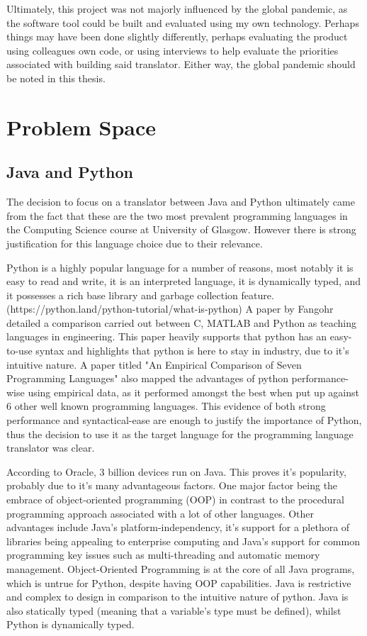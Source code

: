 \documentclass{l4proj}
\begin{document}
Ultimately, this project was not majorly influenced by the global pandemic, as the software tool could be built and evaluated using my own technology. Perhaps things may have been done slightly differently, perhaps evaluating the product using colleagues own code, or using interviews to help evaluate the priorities associated with building said translator. Either way, the global pandemic should be noted in this thesis.

\section{Problem Space}
\subsection{Java and Python}

The decision to focus on a translator between Java and Python ultimately came from the fact that these are the two most prevalent programming languages in the Computing Science course at University of Glasgow. However there is strong justification for this language choice due to their relevance.

Python is a highly popular language for a number of reasons, most notably it is easy to read and write, it is an interpreted language, it is dynamically typed, and it possesses a rich base library and garbage collection feature. (https://python.land/python-tutorial/what-is-python) A paper by Fangohr detailed a comparison carried out between C, MATLAB and Python as teaching languages in engineering. This paper heavily supports that python has an easy-to-use syntax and highlights that python is here to stay in industry, due to it's intuitive nature. A paper titled "An Empirical Comparison of Seven Programming Languages" also mapped the advantages of python performance-wise using empirical data, as it performed amongst the best when put up against 6 other well known programming languages. This evidence of both strong performance and syntactical-ease are enough to justify the importance of Python, thus the decision to use it as the target language for the programming language translator was clear.

According to Oracle, 3 billion devices run on Java. This proves it's popularity, probably due to it's many advantageous factors. One major factor being the embrace of object-oriented programming (OOP) in contrast to the procedural programming approach associated with a lot of other languages. Other advantages include Java's platform-independency, it's support for a plethora of libraries being appealing to enterprise computing and Java's support for common programming key issues such as multi-threading and automatic memory management. 
Object-Oriented Programming is at the core of all Java programs, which is untrue for Python, despite having OOP capabilities. Java is restrictive and complex to design in comparison to the intuitive nature of python. Java is also statically typed (meaning that a variable's type must be defined), whilst Python is dynamically typed.
\end{document}
